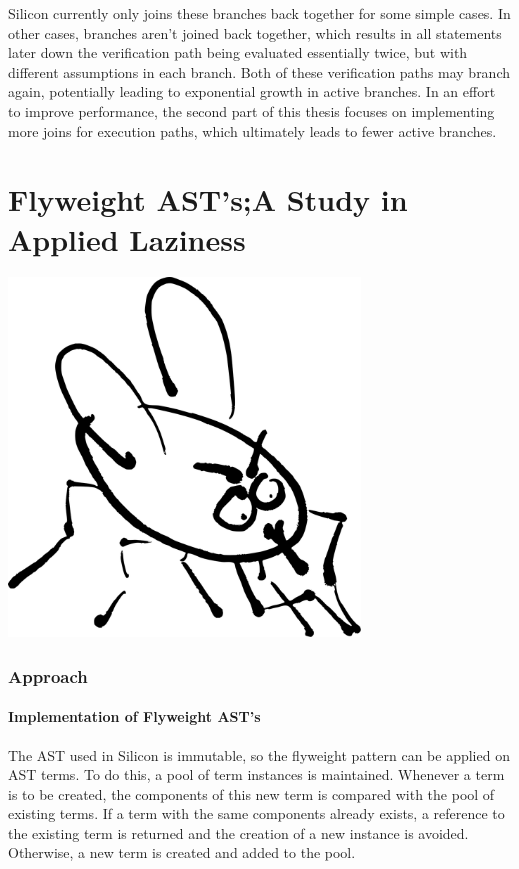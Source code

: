 \documentclass[11pt]{article}
\begin{document}
    Silicon currently only joins these branches back together for some simple cases. In other cases,
    branches aren't joined back together, which results in all statements later down the verification path
    being evaluated essentially twice, but with different assumptions in each branch. Both of these
    verification paths may branch again, potentially leading to exponential growth in active branches.
    In an effort to improve performance, the second part of this thesis focuses on implementing more
    joins for execution paths, which ultimately leads to fewer active branches.

    \part{Flyweight AST's;\newline A Study in Applied Laziness}
    \begin{center}
        \vspace{3cm}
        \includegraphics[width=0.7\textwidth]{fly}
    \end{center}

    \newpage
    \section{Approach}

    \subsection{Implementation of Flyweight AST's}
    
    The AST used in Silicon is immutable, so the flyweight pattern \cite{patterns}
    can be applied on AST terms.
    To do this, a pool of term instances is maintained. Whenever a term
    is to be created, the components of this new term is compared with the
    pool of existing terms. If a term with the same components already exists,
    a reference to the existing term is returned and
    the creation of a new instance is avoided. Otherwise, a new term is created and added to
    the pool.
\end{document}
